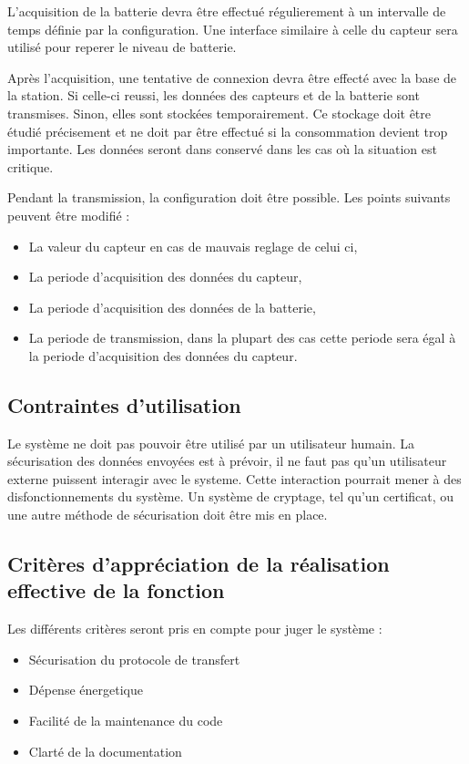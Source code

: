 L'acquisition de la batterie devra être effectué régulierement à un intervalle de temps définie par la configuration. Une interface similaire à celle du capteur sera utilisé pour reperer le niveau de batterie.

Après l'acquisition, une tentative de connexion devra être effecté avec la base de la station. Si celle-ci reussi, les données des capteurs et de la batterie sont transmises. Sinon, elles sont stockées temporairement. Ce stockage doit être étudié précisement et ne doit par être effectué si la consommation devient trop importante. Les données seront dans conservé dans les cas où la situation est critique.  

Pendant la transmission, la configuration doit être possible. Les points suivants peuvent être modifié :
\begin{itemize}
\item La valeur du capteur en cas de mauvais reglage de celui ci,
\item La periode d'acquisition des données du capteur,
\item La periode d'acquisition des données de la batterie,
\item La periode de transmission, dans la plupart des cas cette periode sera égal à la periode d'acquisition des données du capteur. 
\end{itemize}

\subsection{Contraintes d'utilisation}

Le système ne doit pas pouvoir être utilisé par un utilisateur humain. La sécurisation des données envoyées est à prévoir, il ne faut pas qu'un utilisateur externe puissent interagir avec le systeme. Cette interaction pourrait mener à des disfonctionnements du système. Un système de cryptage, tel qu'un certificat, ou une autre méthode de sécurisation doit être mis en place.

\subsection{Critères d'appréciation de la réalisation effective de la fonction}
Les différents critères seront pris en compte pour juger le système :
\begin{itemize}
\item Sécurisation du protocole de transfert
\item Dépense énergetique
\item Facilité de la maintenance du code
\item Clarté de la documentation
\end{itemize}

